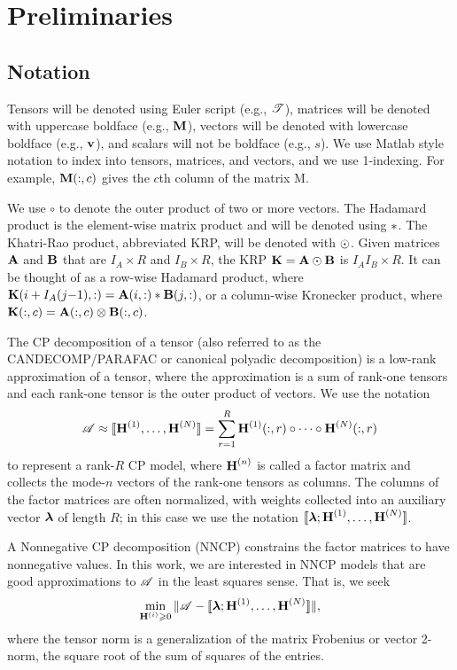 
\section{Preliminaries} 
\label{sec:prelims}

\subsection{Notation}

Tensors will be denoted using Euler script (e.g., $\T{T}$), 
matrices will be denoted with uppercase boldface (e.g., $\M{M}$), vectors will be denoted with lowercase boldface  
(e.g., $\V{v}$), and scalars will not be boldface (e.g., $s$). 
We use Matlab style notation to index into tensors, matrices, and vectors, and we use 1-indexing. 
For example, $\M{M}(:,c)$ gives the $c$th column of the matrix M.

We use $\circ$ to denote the outer product of two or more vectors.
The Hadamard product is the element-wise matrix product and will be denoted using $\ast$. 
The Khatri-Rao product, abbreviated KRP, will be denoted with $\odot$. 
Given matrices $\M{A}$ and $\M{B}$ that are $I_{A} \times R$ and $I_{B} \times R$, the KRP $\M{K} = \M{A} \Khat \M{B}$ is $I_{A}I_{B} \times R$. 
It can be thought of as a row-wise Hadamard product, where $\M{K}(i+I_{A}(j{-}1),:) = \M{A}(i,:) \Hada \M{B}(j,:)$, or a column-wise Kronecker product, where $\M{K}(:,c) =  \M{A}(:,c) \Kron \M{B}(:,c)$.

The CP decomposition of a tensor (also referred to as the CANDECOMP/PARAFAC or canonical polyadic decomposition) is a low-rank approximation of a tensor, where the approximation is a sum of rank-one tensors and each rank-one tensor is the outer product of vectors.
We use the notation
$$\TA \approx \CP = \sum_{r=1}^R \Mn{H}{1}(:,r) \circ \cdots \circ \Mn{H}{N}(:,r)$$
to represent a rank-$R$ CP model, where $\Mn{H}{n}$ is called a factor matrix and collects the mode-$n$ vectors of the rank-one tensors as columns.
The columns of the factor matrices are often normalized, with weights collected into an auxiliary vector $\V{\lambda}$ of length $R$; in this case we use the notation $\CPl$.

A Nonnegative CP decomposition (NNCP) constrains the factor matrices to have nonnegative values.
In this work, we are interested in NNCP models that are good approximations to $\TA$ in the least squares sense.
That is, we seek 
$$\min_{\HH^{(i)} \geq 0}  \| \TA - \CPl \|,$$
where the tensor norm is a generalization of the matrix Frobenius or vector 2-norm, the square root of the sum of squares of the entries.

